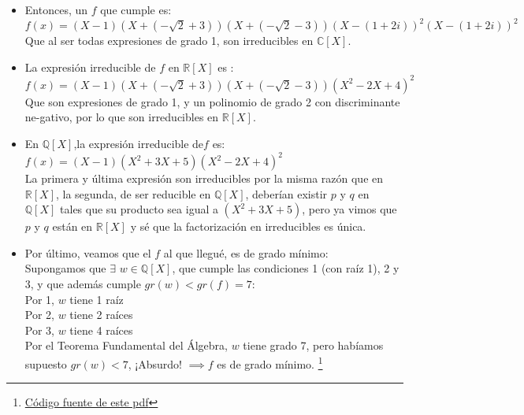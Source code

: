 \documentclass[12pt,twoside,a4paper]{exam}
\begin{document}
\begin{itemize}
      \item Entonces, un $f$ que cumple es: \\
            $f(x)=(X-1)(X+(-\sqrt{2}+3))(X+(-\sqrt{2}-3))(X-(1+2i))^2(X-(1+2i))^2$\\
            Que al ser todas expresiones de grado 1, son irreducibles en $\mathbb{C}[X]$.\\
      \item La expresión irreducible de $f$ en  $\mathbb{R}[X]$ es : \\
            $f(x)=(X-1)(X+(-\sqrt{2}+3))(X+(-\sqrt{2}-3))(X^2-2X+4)^2$\\
            Que son expresiones de grado 1, y un polinomio de grado 2
            con discriminante ne-gativo, por lo que son irreducibles en $\mathbb{R}[X]$.\\
      \item En $\mathbb{Q}[X]$,la expresión irreducible de$f$ es:\\
            $f(x)=(X-1)(X^2+3X+5)(X^2-2X+4)^2$\\
            La primera y última expresión son irreducibles por la misma razón que en 
            $\mathbb{R}[X]$, la segunda, de ser reducible en $\mathbb{Q}[X]$, deberían
            existir $p$ y $q$ en $\mathbb{Q}[X]$ tales que su producto sea igual
            a $(X^2+3X+5)$, pero ya vimos que  $p$ y $q$ están en $\mathbb{R}[X]$
            y sé que la factorización en irreducibles es única.
      \item Por último, veamos que el $f$ al que llegué, es de grado mínimo:\\
            Supongamos que $\exists$ $w \in \mathbb{Q}[X]$, que cumple las condiciones
            1 (con raíz 1), 2 y 3, y que además cumple $gr(w)<gr(f)=7$:\\
            Por 1, $w$ tiene 1 raíz \\
            Por 2, $w$ tiene 2 raíces \\
            Por 3, $w$ tiene 4 raíces \\
            Por el Teorema Fundamental del Álgebra, $w$ tiene grado 7, pero
            habíamos supuesto $gr(w) < 7 $, ¡Absurdo! $\implies f$ es de grado mínimo.
            \footnote{\href{https://github.com/fkrause98/latex/blob/master/recuAlgebra.tex}{Código fuente de este pdf}} 
\end{itemize}
\end{document}
